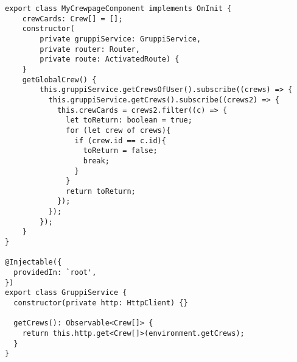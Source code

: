\begin{lstlisting}[style=Java, caption = {Esempio implementazione \textit{pattern Observer}}]
export class MyCrewpageComponent implements OnInit {
    crewCards: Crew[] = [];
    constructor(
        private gruppiService: GruppiService,
        private router: Router,
        private route: ActivatedRoute) {
    }
    getGlobalCrew() {
        this.gruppiService.getCrewsOfUser().subscribe((crews) => {
          this.gruppiService.getCrews().subscribe((crews2) => {
            this.crewCards = crews2.filter((c) => {
              let toReturn: boolean = true;
              for (let crew of crews){
                if (crew.id == c.id){
                  toReturn = false;
                  break;
                }
              }
              return toReturn;
            });
          });
        });
    }
}

@Injectable({
  providedIn: `root',
})
export class GruppiService {
  constructor(private http: HttpClient) {}

  getCrews(): Observable<Crew[]> {
    return this.http.get<Crew[]>(environment.getCrews);
  }
}
\end{lstlisting}